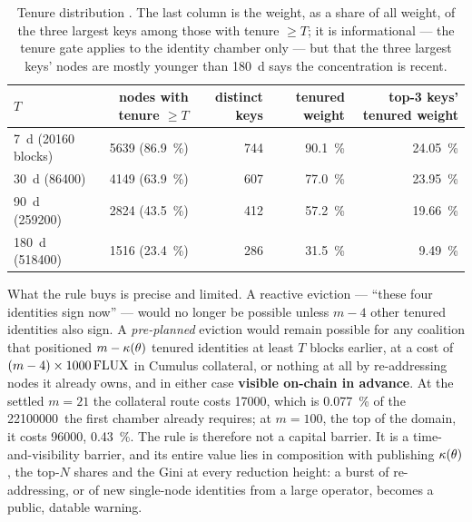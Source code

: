 \begin{table}[H]
\centering
\small
\begin{tabular}{@{}lrrrr@{}}
\toprule
$T$ & nodes with tenure $\ge T$ & distinct keys & tenured weight & top-3 keys' tenured weight \\
\midrule
\SI{7}{\day} (\num{20160} blocks)   & \num{5639} (\SI{86.9}{\percent}) & 744 & \SI{90.1}{\percent} & \SI{24.05}{\percent} \\
\SI{30}{\day} (\num{86400})         & \num{4149} (\SI{63.9}{\percent}) & 607 & \SI{77.0}{\percent} & \SI{23.95}{\percent} \\
\SI{90}{\day} (\num{259200})        & \num{2824} (\SI{43.5}{\percent}) & 412 & \SI{57.2}{\percent} & \SI{19.66}{\percent} \\
\SI{180}{\day} (\num{518400})       & \num{1516} (\SI{23.4}{\percent}) & 286 & \SI{31.5}{\percent} & \SI{9.49}{\percent} \\
\bottomrule
\end{tabular}
\caption{Tenure distribution . The
last column is the weight, as a share of all weight, of the three largest keys among those with
tenure $\ge T$; it is informational — the tenure gate applies to the identity chamber only — but
that the three largest keys' nodes are mostly younger than \SI{180}{\day} says the concentration is
recent.}
\end{table}

What the rule buys is precise and limited. A reactive eviction — ``these four identities sign now'' —
would no longer be possible unless $m-4$ other tenured identities also sign. A \emph{pre-planned}
eviction would remain possible for any coalition that positioned $m - \kappa(\theta)$ tenured
identities at least $T$ blocks earlier, at a cost of $(m-4) \times \num{1000}\,\mathrm{FLUX}$ in Cumulus
collateral, or nothing at all by re-addressing nodes it already owns, and in either case
\textbf{visible on-chain in advance}. At the settled
$m = 21$ the collateral route costs \num{17000}\flux, which is \SI{0.077}{\percent} of the
\num{22100000}\flux\ the first chamber already requires; at $m = 100$, the top of the domain, it
costs \num{96000}\flux, \SI{0.43}{\percent}. The rule is therefore not a capital
barrier. It is a time-and-visibility barrier, and its entire value lies in composition with
publishing $\kappa(\theta)$, the top-$N$ shares and the Gini at every reduction height: a burst of
re-addressing, or of new single-node identities from a large operator, becomes a public, datable
warning.

